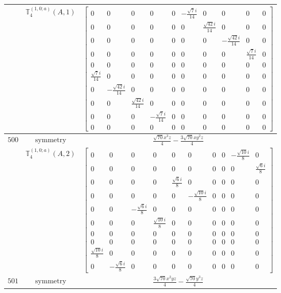 \documentclass[fleqn,8pt,landscape]{jsarticle}
\begin{document}
\begin{longtable}{ccc}
$  $ & $ \mathbb{T}_{4}^{(1,0;a)}(A,1) $ & $ \begin{bmatrix} 0 & 0 & 0 & 0 & 0 & - \frac{\sqrt{7} i}{14} & 0 & 0 & 0 & 0 \\ 0 & 0 & 0 & 0 & 0 & 0 & \frac{\sqrt{42} i}{14} & 0 & 0 & 0 \\ 0 & 0 & 0 & 0 & 0 & 0 & 0 & - \frac{\sqrt{42} i}{14} & 0 & 0 \\ 0 & 0 & 0 & 0 & 0 & 0 & 0 & 0 & \frac{\sqrt{7} i}{14} & 0 \\ 0 & 0 & 0 & 0 & 0 & 0 & 0 & 0 & 0 & 0 \\ \frac{\sqrt{7} i}{14} & 0 & 0 & 0 & 0 & 0 & 0 & 0 & 0 & 0 \\ 0 & - \frac{\sqrt{42} i}{14} & 0 & 0 & 0 & 0 & 0 & 0 & 0 & 0 \\ 0 & 0 & \frac{\sqrt{42} i}{14} & 0 & 0 & 0 & 0 & 0 & 0 & 0 \\ 0 & 0 & 0 & - \frac{\sqrt{7} i}{14} & 0 & 0 & 0 & 0 & 0 & 0 \\ 0 & 0 & 0 & 0 & 0 & 0 & 0 & 0 & 0 & 0 \end{bmatrix} $ \\ \hline
$ 500 $ & $ \text{symmetry} $ & $ \frac{\sqrt{70} x^{3} z}{4} - \frac{3 \sqrt{70} x y^{2} z}{4} $ \\
$  $ & $ \mathbb{T}_{4}^{(1,0;a)}(A,2) $ & $ \begin{bmatrix} 0 & 0 & 0 & 0 & 0 & 0 & 0 & 0 & - \frac{\sqrt{10} i}{8} & 0 \\ 0 & 0 & 0 & 0 & 0 & 0 & 0 & 0 & 0 & \frac{\sqrt{6} i}{8} \\ 0 & 0 & 0 & 0 & \frac{\sqrt{6} i}{8} & 0 & 0 & 0 & 0 & 0 \\ 0 & 0 & 0 & 0 & 0 & - \frac{\sqrt{10} i}{8} & 0 & 0 & 0 & 0 \\ 0 & 0 & - \frac{\sqrt{6} i}{8} & 0 & 0 & 0 & 0 & 0 & 0 & 0 \\ 0 & 0 & 0 & \frac{\sqrt{10} i}{8} & 0 & 0 & 0 & 0 & 0 & 0 \\ 0 & 0 & 0 & 0 & 0 & 0 & 0 & 0 & 0 & 0 \\ 0 & 0 & 0 & 0 & 0 & 0 & 0 & 0 & 0 & 0 \\ \frac{\sqrt{10} i}{8} & 0 & 0 & 0 & 0 & 0 & 0 & 0 & 0 & 0 \\ 0 & - \frac{\sqrt{6} i}{8} & 0 & 0 & 0 & 0 & 0 & 0 & 0 & 0 \end{bmatrix} $ \\ \hline
$ 501 $ & $ \text{symmetry} $ & $ \frac{3 \sqrt{70} x^{2} y z}{4} - \frac{\sqrt{70} y^{3} z}{4} $ \\

\end{longtable}
\end{document}
